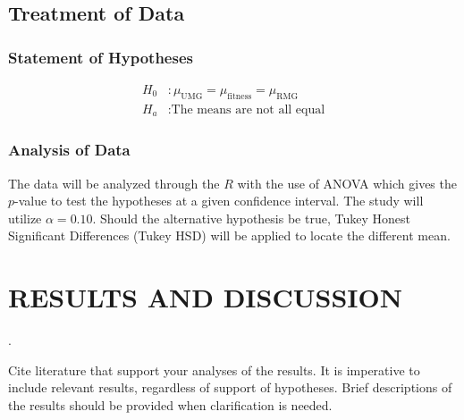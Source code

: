\documentclass{strrespaper-trad}
\begin{document}
		\section{Treatment of Data}
			\subsection{Statement of Hypotheses} \vspace{-2em}
				\begin{align*}
					H_0&: \mu_\mathrm{UMG} = \mu_\mathrm{fitness} = \mu_\mathrm{RMG} \\
					H_a&: \text{The means are not all equal}
				\end{align*}
			\subsection{Analysis of Data}
				The data will be analyzed through the $R$ with the use of ANOVA which gives the $p$-value to test the hypotheses at a given confidence interval.
				The study will utilize $\alpha = 0.10$.
				Should the alternative hypothesis be true, Tukey Honest Significant Differences (Tukey HSD) will be applied to locate the different mean.


	\chapter{RESULTS AND DISCUSSION}
		.

		Cite literature that support your analyses of the results.
		It is imperative to include relevant results, regardless of support of hypotheses.
		Brief descriptions of the results should be provided when clarification is needed.
\end{document}
